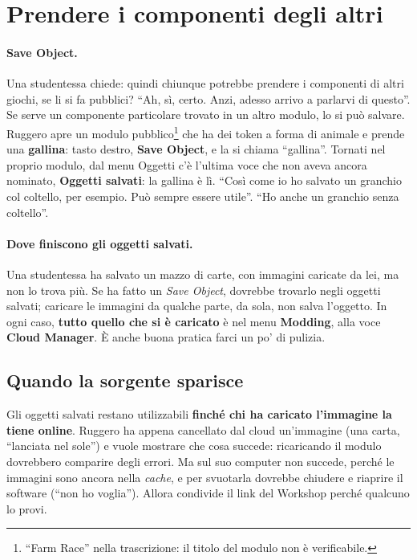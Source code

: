 \section{Prendere i componenti degli altri}
\label{a8:sec:riuso}

\paragraph{Save Object.} Una studentessa chiede: quindi chiunque potrebbe prendere i
componenti di altri giochi, se li si fa pubblici? ``Ah, sì, certo. Anzi, adesso arrivo
a parlarvi di questo''. Se serve un componente particolare trovato in un altro modulo,
lo si può salvare. Ruggero apre un modulo pubblico\footnote{``Farm Race'' nella
trascrizione: il titolo del modulo non è verificabile.} che ha dei token a forma di
animale e prende una \textbf{gallina}: tasto destro, \textbf{Save Object}, e la si
chiama ``gallina''. Tornati nel proprio modulo, dal menu Oggetti c'è l'ultima voce che
non aveva ancora nominato, \textbf{Oggetti salvati}: la gallina è lì. ``Così come io
ho salvato un granchio col coltello, per esempio. Può sempre essere utile''. ``Ho anche
un granchio senza coltello''.

\paragraph{Dove finiscono gli oggetti salvati.} Una studentessa ha salvato un mazzo di
carte, con immagini caricate da lei, ma non lo trova più. Se ha fatto un \emph{Save
Object}, dovrebbe trovarlo negli oggetti salvati; caricare le immagini da qualche parte,
da sola, non salva l'oggetto. In ogni caso, \textbf{tutto quello che si è caricato} è
nel menu \textbf{Modding}, alla voce \textbf{Cloud Manager}. È anche buona pratica
farci un po' di pulizia.

\subsection{Quando la sorgente sparisce}
\label{a8:sec:sorgente}

Gli oggetti salvati restano utilizzabili \textbf{finché chi ha caricato l'immagine la
tiene online}. Ruggero ha appena cancellato dal cloud un'immagine (una carta,
``lanciata nel sole'') e vuole mostrare che cosa succede: ricaricando il modulo
dovrebbero comparire degli errori. Ma sul suo computer non succede, perché le immagini
sono ancora nella \emph{cache}, e per svuotarla dovrebbe chiudere e riaprire il software
(``non ho voglia''). Allora condivide il link del Workshop perché qualcuno lo provi.

